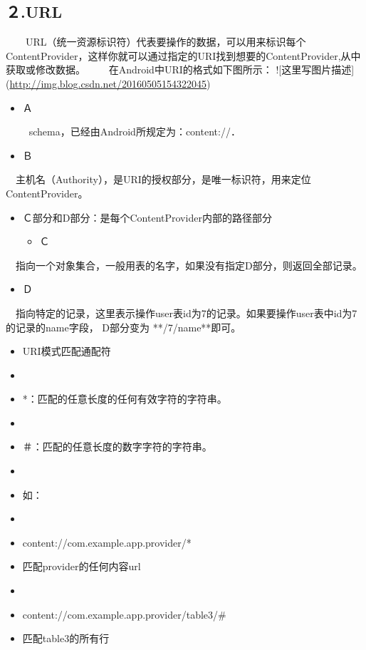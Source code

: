 \documentclass[9pt, b5paper]{article}
\begin{document}
\subsection{２.URL}
\label{sec-14-2}
 　　URL（统一资源标识符）代表要操作的数据，可以用来标识每个ContentProvider，这样你就可以通过指定的URI找到想要的ContentProvider,从中获取或修改数据。
 　　在Android中URI的格式如下图所示：
![这里写图片描述](\url{http://img.blog.csdn.net/20160505154322045})　

\begin{itemize}
\item Ａ
\end{itemize}
　
　schema，已经由Android所规定为：content://．　
　
\begin{itemize}
\item Ｂ
\end{itemize}
　主机名（Authority），是URI的授权部分，是唯一标识符，用来定位ContentProvider。
\begin{itemize}
\item Ｃ部分和D部分：是每个ContentProvider内部的路径部分
\begin{itemize}
\item Ｃ
\end{itemize}
\end{itemize}
　指向一个对象集合，一般用表的名字，如果没有指定D部分，则返回全部记录。
\begin{itemize}
\item Ｄ
\end{itemize}
　指向特定的记录，这里表示操作user表id为7的记录。如果要操作user表中id为7的记录的name字段， D部分变为       **/7/name**即可。
\begin{itemize}
\item URI模式匹配通配符
\item 
\item *：匹配的任意长度的任何有效字符的字符串。
\item 
\item ＃：匹配的任意长度的数字字符的字符串。
\item 
\item 如：
\item 
\item content://com.example.app.provider/*
\item 匹配provider的任何内容url
\item 
\item content://com.example.app.provider/table3/\#
\item 匹配table3的所有行
\end{itemize}
\end{document}
